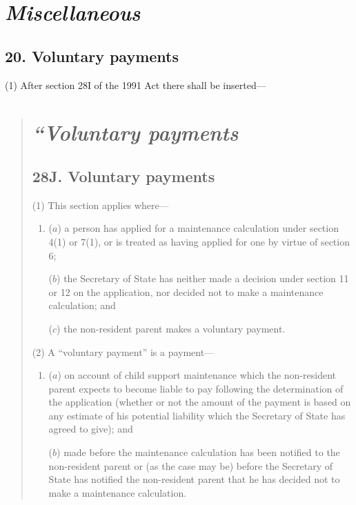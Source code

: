 \documentclass[12pt,a4paper]{article}
\begin{document}

\section{\itshape Miscellaneous}

\subsection{20. Voluntary payments}

(1) After section 28I of the 1991 Act there shall be inserted—
\begin{quotation}
\section*{\itshape “Voluntary payments}

\subsection*{28J. Voluntary payments}

(1) This section applies where—
\begin{enumerate}\item[]
($a$) a person has applied for a maintenance calculation under section 4(1)  or 7(1), or is treated as having applied for one by virtue of section 6;

($b$) the Secretary of State has neither made a decision under section 11 or 12 on the application, nor decided not to make a maintenance calculation; and

($c$) the non-resident parent makes a voluntary payment.
\end{enumerate}

(2) A “voluntary payment” is a payment—
\begin{enumerate}\item[]
($a$) on account of child support maintenance which the non-resident parent expects to become liable to pay following the determination of the application (whether or not the amount of the payment is based on any estimate of his potential liability which the Secretary of State has agreed to give); and

($b$) made before the maintenance calculation has been notified to the non-resident parent or (as the case may be) before the Secretary of State has notified the non-resident parent that he has decided not to make a maintenance calculation.
\end{enumerate}


\end{quotation}
\end{document}
